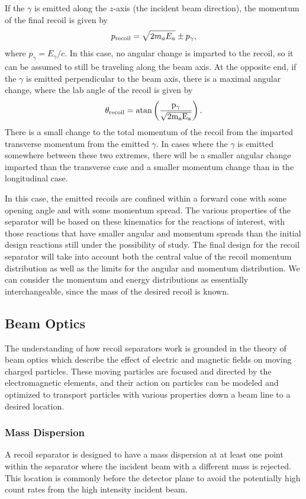 If the $\gamma$ is emitted along the $z$-axis (the incident beam direction),
the momentum of the final recoil is given by
\[
    p_{\rm{recoil}} = \sqrt{2m_aE_a} \pm p_{\gamma},
\]
where $p_{\gamma} = E_{\gamma}/c$. In this case, no angular change is imparted
to the recoil, so it can be assumed to still be traveling along the beam axis.
At the opposite end, if the $\gamma$ is emitted perpendicular to the beam axis,
there is a maximal angular change, where the lab angle of the recoil is
given by
\[
    \theta_{\rm{recoil}} = \rm{atan}\left(\frac{p_{\gamma}}{\sqrt{2m_aE_a}}\right).
\]
There is a small change to the total momentum of the recoil from the imparted
transverse momentum from the emitted $\gamma$. In cases where the $\gamma$ is
emitted somewhere between these two extremes, there will be a smaller angular
change imparted than the transverse case and a smaller momentum change than in
the longitudinal case.

In this case, the emitted recoils are confined within a forward cone with
some opening angle and with some momentum spread. The various properties of
the separator will be based on these kinematics for the reactions of interest,
with those reactions that have smaller angular and momentum spreads than the
initial design reactions still under the possibility of study. The final design
for the recoil separator will take into account both the central value of the
recoil momentum distribution as well as the limits for the angular and momentum
distribution. We can consider the momentum and energy distributions as
essentially interchangeable, since the mass of the desired recoil is known.

\subsection{Beam Optics}

The understanding of how recoil separators work is grounded in the theory of
beam optics which describe the effect of electric and magnetic fields on moving
charged particles. These moving particles are focused and directed by the
electromagnetic elements, and their action on particles can be modeled and
optimized to transport particles with various properties down a beam line to a
desired location.

\subsubsection{Mass Dispersion}
A recoil separator is designed to have a mass dispersion at at least one point
within the separator where the incident beam with a different mass is rejected.
This location is commonly before the detector plane to avoid the potentially
high count rates from the high intensity incident beam.

